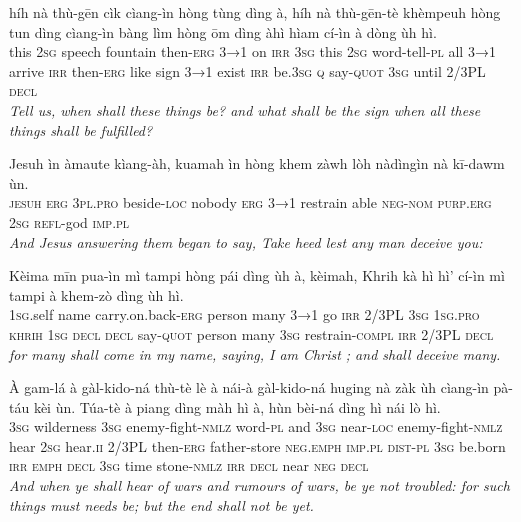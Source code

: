 \documentclass[11pt,a4paper]{article}
\begin{document}
\begin{exe}
\gll híh nà thù-gēn cìk cìang-ìn hòng tùng dìng à, híh nà thù-gēn-tè khèmpeuh hòng tun dìng cìang-ìn bàng lìm hòng ōm dìng àhì hìam cí-ìn à dòng ùh hì. \\
     this \textsc{2sg} speech fountain then-\textsc{erg} \textsc{3→1} on \textsc{irr} \textsc{3sg} this \textsc{2sg} word-tell-\textsc{pl} all \textsc{3→1} arrive \textsc{irr} then-\textsc{erg} like sign \textsc{3→1} exist \textsc{irr} be.\textsc{3sg} \textsc{q} say-\textsc{quot} \textsc{3sg} until 2/3PL \textsc{decl} \\
\glt \textcolor{kjvcolor}{\textit{Tell us, when shall these things be? and what shall be the sign when all these things shall be fulfilled?}}

\gll Jesuh ìn àmaute kìang-àh, kuamah ìn hòng khem zàwh lòh nàdìngìn nà kī-dawm ùn. \\
     \textsc{jesuh} \textsc{erg} \textsc{3pl}.\textsc{pro} beside-\textsc{loc} nobody \textsc{erg} \textsc{3→1} restrain able \textsc{neg}-\textsc{nom} \textsc{purp}.\textsc{erg} \textsc{2sg} \textsc{refl}-god \textsc{imp}.\textsc{pl} \\
\glt \textcolor{kjvcolor}{\textit{And Jesus answering them began to say, Take heed lest any man deceive you:}}

\gll Kèima mīn pua-ìn mì tampi hòng pái dìng ùh à, kèimah, Khrih kà hì hì' cí-ìn mì tampi à khem-zò dìng ùh hì. \\
     \textsc{1sg}.self name carry.on.back-\textsc{erg} person many \textsc{3→1} go \textsc{irr} 2/3PL \textsc{3sg} \textsc{1sg}.\textsc{pro} \textsc{khrih} \textsc{1sg} \textsc{decl} \textsc{decl} say-\textsc{quot} person many \textsc{3sg} restrain-\textsc{compl} \textsc{irr} 2/3PL \textsc{decl} \\
\glt \textcolor{kjvcolor}{\textit{for many shall come in my name, saying, I am Christ ; and shall deceive many.}}

\gll À gam-lá à gàl-kido-ná thù-tè lè à nái-à gàl-kido-ná huging nà zàk ùh cìang-ìn pà-táu kèi ùn. Túa-tè à piang dìng màh hì à, hùn bèi-ná dìng hì nái lò hì. \\
     \textsc{3sg} wilderness \textsc{3sg} enemy-fight-\textsc{nmlz} word-\textsc{pl} and \textsc{3sg} near-\textsc{loc} enemy-fight-\textsc{nmlz} hear \textsc{2sg} hear.\textsc{ii} 2/3PL then-\textsc{erg} father-store \textsc{neg}.\textsc{emph} \textsc{imp}.\textsc{pl} \textsc{dist}-\textsc{pl} \textsc{3sg} be.born \textsc{irr} \textsc{emph} \textsc{decl} \textsc{3sg} time stone-\textsc{nmlz} \textsc{irr} \textsc{decl} near \textsc{neg} \textsc{decl} \\
\glt \textcolor{kjvcolor}{\textit{And when ye shall hear of wars and rumours of wars, be ye not troubled: for such things must needs be; but the end shall not be yet.}}


\end{exe}
\end{document}
